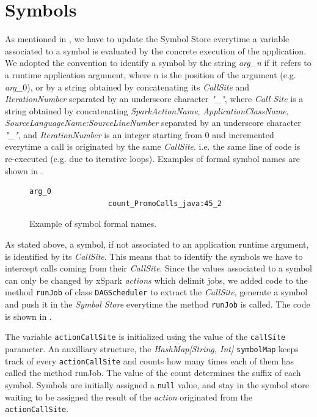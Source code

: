 \section{Symbols}\label{sec:symbols}
As mentioned in , we have to update the Symbol Store everytime a variable associated to a symbol is evaluated by the concrete execution of the application. We adopted the convention to identify a symbol by the string \textit{arg\_n} if it refers to a runtime application argument, where n is the position of the argument (e.g. \textit{arg\_$0$}), or by a string obtained by concatenating its \textit{CallSite} and \textit{IterationNumber} separated by an underscore character \textit{"\_"}, where \textit{Call Site} is a string obtained by concatenating \textit{SparkActionName}, \textit{ApplicationClassName}, \textit{SourceLanguageName:SourceLineNumber} separated by an underscore character \textit{"\_"}, and  \textit{IterationNumber} is an integer starting from $0$ and incremented everytime a call is originated by the same \textit{CallSite}. i.e. the same line of code is re-executed (e.g. due to iterative loops). Examples of formal symbol names are shown in .
\begin{figure}[tbhp]
	\centering
	\begin{lstlisting}[basicstyle=\ttfamily\scriptsize]
		          arg_0
		          count_PromoCalls_java:45_2
	\end{lstlisting}
	\caption{Example of symbol formal names.}
	\label{fig:symbol_name}
\end{figure}

As stated above, a symbol, if not associated to an application runtime argument,  is identified by its \textit{CallSite}. This means that to identify the symbols we have to intercept calls coming from their  \textit{CallSite}. Since the values associated to a symbol can only be changed by xSpark \textit{actions} which delimit jobs, we added code to the method \texttt{runJob} of class \texttt{DAGScheduler} to extract the \textit{CallSite}, generate a symbol and push it in the \textit{Symbol Store} everytime the method \texttt{runJob} is called. The code is shown in . 

The variable \texttt{actionCallSite} is initialized using the value of the \texttt{callSite} parameter.
An auxilliary structure, the \textit{HashMap[String, Int]} \texttt{symbolMap} keeps track of every \texttt{actionCallSite} and counts how many times each of them has called the method runJob. The value of the count determines the suffix of each symbol. Symbols are initially assigned a \texttt{null} value, and stay in the symbol store waiting to be assigned the result of the \textit{action} originated from the \texttt{actionCallSite}. 

